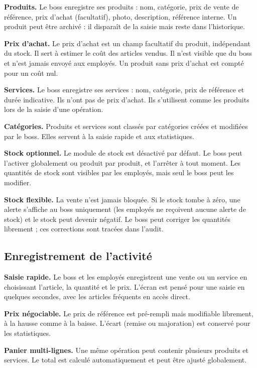 \documentclass[11pt,a4paper]{article}
\newcommand{\fonc}[2]{\textbf{#1.} #2\par\vspace{0.2em}}
\begin{document}
	\fonc{Produits}{Le boss enregistre ses produits : nom, catégorie, prix de vente de référence, prix d'achat (facultatif), photo, description, référence interne. Un produit peut être archivé : il disparaît de la saisie mais reste dans l'historique.}
	
	\fonc{Prix d'achat}{Le prix d'achat est un champ facultatif du produit, indépendant du stock. Il sert à estimer le coût des articles vendus. Il n'est visible que du boss et n'est jamais envoyé aux employés. Un produit sans prix d'achat est compté pour un coût nul.}
	
	\fonc{Services}{Le boss enregistre ses services : nom, catégorie, prix de référence et durée indicative. Ils n'ont pas de prix d'achat. Ils s'utilisent comme les produits lors de la saisie d'une opération.}
	
	\fonc{Catégories}{Produits et services sont classés par catégories créées et modifiées par le boss. Elles servent à la saisie rapide et aux statistiques.}
	
	\fonc{Stock optionnel}{Le module de stock est désactivé par défaut. Le boss peut l'activer globalement ou produit par produit, et l'arrêter à tout moment. Les quantités de stock sont visibles par les employés, mais seul le boss peut les modifier.}
	
	\fonc{Stock flexible}{La vente n'est jamais bloquée. Si le stock tombe à zéro, une alerte s'affiche au boss uniquement (les employés ne reçoivent aucune alerte de stock) et le stock peut devenir négatif. Le boss peut corriger les quantités librement ; ces corrections sont tracées dans l'audit.}
	
	\subsection{Enregistrement de l'activité}
	
	\fonc{Saisie rapide}{Le boss et les employés enregistrent une vente ou un service en choisissant l'article, la quantité et le prix. L'écran est pensé pour une saisie en quelques secondes, avec les articles fréquents en accès direct.}
	
	\fonc{Prix négociable}{Le prix de référence est pré-rempli mais modifiable librement, à la hausse comme à la baisse. L'écart (remise ou majoration) est conservé pour les statistiques.}
	
	\fonc{Panier multi-lignes}{Une même opération peut contenir plusieurs produits et services. Le total est calculé automatiquement et peut être ajusté globalement.}
	
\end{document}
